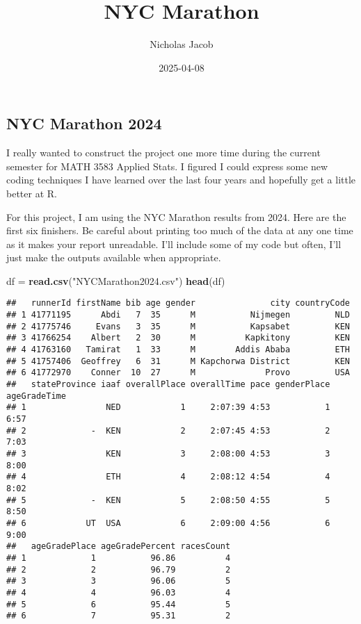 \documentclass[
]{article}
\title{NYC Marathon}
\author{Nicholas Jacob}
\date{2025-04-08}
\newenvironment{Shaded}{\begin{snugshade}}{\end{snugshade}}
\newcommand{\FunctionTok}[1]{\textcolor[rgb]{0.13,0.29,0.53}{\textbf{#1}}}
\newcommand{\NormalTok}[1]{#1}
\newcommand{\OtherTok}[1]{\textcolor[rgb]{0.56,0.35,0.01}{#1}}
\newcommand{\StringTok}[1]{\textcolor[rgb]{0.31,0.60,0.02}{#1}}
\begin{document}
\maketitle

\subsection{NYC Marathon 2024}\label{nyc-marathon-2024}

I really wanted to construct the project one more time during the
current semester for MATH 3583 Applied Stats. I figured I could express
some new coding techniques I have learned over the last four years and
hopefully get a little better at R.

For this project, I am using the NYC Marathon results from 2024. Here
are the first six finishers. Be careful about printing too much of the
data at any one time as it makes your report unreadable. I'll include
some of my code but often, I'll just make the outputs available when
appropriate.

\begin{Shaded}
\begin{Highlighting}[]
\NormalTok{df }\OtherTok{=} \FunctionTok{read.csv}\NormalTok{(}\StringTok{"NYCMarathon2024.csv"}\NormalTok{)}
\FunctionTok{head}\NormalTok{(df)}
\end{Highlighting}
\end{Shaded}

\begin{verbatim}
##   runnerId firstName bib age gender               city countryCode
## 1 41771195      Abdi   7  35      M           Nijmegen         NLD
## 2 41775746     Evans   3  35      M           Kapsabet         KEN
## 3 41766254    Albert   2  30      M          Kapkitony         KEN
## 4 41763160   Tamirat   1  33      M        Addis Ababa         ETH
## 5 41757406  Geoffrey   6  31      M Kapchorwa District         KEN
## 6 41772970    Conner  10  27      M              Provo         USA
##   stateProvince iaaf overallPlace overallTime pace genderPlace ageGradeTime
## 1                NED            1     2:07:39 4:53           1         6:57
## 2             -  KEN            2     2:07:45 4:53           2         7:03
## 3                KEN            3     2:08:00 4:53           3         8:00
## 4                ETH            4     2:08:12 4:54           4         8:02
## 5             -  KEN            5     2:08:50 4:55           5         8:50
## 6            UT  USA            6     2:09:00 4:56           6         9:00
##   ageGradePlace ageGradePercent racesCount
## 1             1           96.86          4
## 2             2           96.79          2
## 3             3           96.06          5
## 4             4           96.03          4
## 5             6           95.44          5
## 6             7           95.31          2
\end{verbatim}
\end{document}
